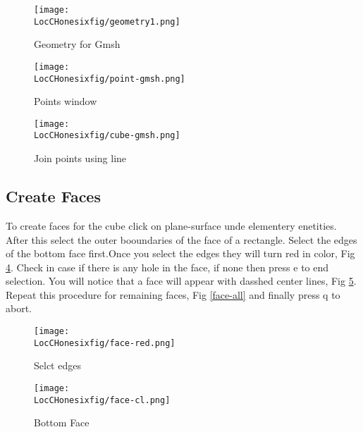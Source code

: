 \begin{figure}[t]  
\begin{center}  
\texttt{[image: \\LocCHonesixfig/geometry1.png]}
\caption{Geometry for Gmsh}
\label{geometry1}
\end{center}  
\end{figure}

\begin{figure}[t]  
\begin{center}  
\texttt{[image: \\LocCHonesixfig/point-gmsh.png]}
\caption{Points window}
\label{point}
\end{center}  
\end{figure}

\begin{figure}[t]  
\begin{center}  
\texttt{[image: \\LocCHonesixfig/cube-gmsh.png]}
\caption{Join points using line}
\label{line}
\end{center}  
\end{figure}

\subsection{Create Faces}

To create faces for the cube click on plane-surface unde elementery enetities. After this select the outer booundaries of the face of a rectangle.
Select the edges of the bottom face first.Once you select the edges they will turn red in color, Fig \ref{face}. Check in case if there is any hole in the 
face, if none then press e to end selection. You will notice that a face will appear with dasshed center lines, Fig \ref{cl}. Repeat this procedure for 
remaining faces, Fig \ref{face-all} and finally press q to abort.

\begin{figure}[t]  
\begin{center}  
\texttt{[image: \\LocCHonesixfig/face-red.png]}
\caption{Selct edges}
\label{face}
\end{center}  
\end{figure}


\begin{figure}[t]  
\begin{center}  
\texttt{[image: \\LocCHonesixfig/face-cl.png]}
\caption{Bottom Face}
\label{cl}
\end{center}  
\end{figure}

